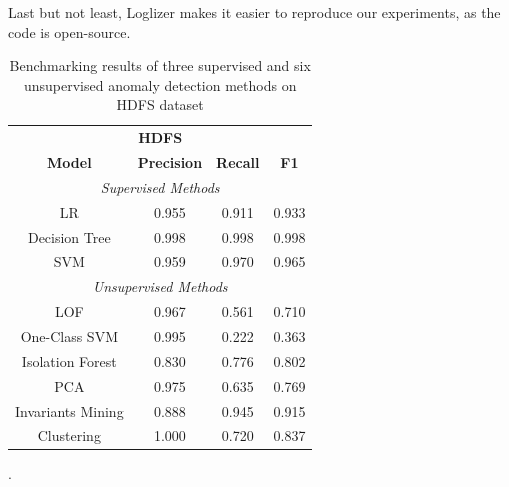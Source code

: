 Last but not least, Loglizer makes it easier to reproduce our experiments, as the code is open-source.

\begin{table}[h]
\centering
\begin{tabular}{@{}cccc@{}}
\toprule
\multicolumn{4}{c}{\textbf{HDFS}} \\ 
\textbf{Model}    & \textbf{Precision} & \textbf{Recall} & \textbf{F1} \\  \toprule \midrule
\multicolumn{4}{c}{\textit{Supervised Methods}}                        \\ \midrule
LR                & 0.955              & 0.911           & 0.933       \\
Decision Tree     & 0.998              & 0.998           & 0.998       \\
SVM               & 0.959              & 0.970           & 0.965       \\ \midrule
\multicolumn{4}{c}{\textit{Unsupervised Methods}}                      \\ \midrule
LOF      & 0.967              & 0.561           & 0.710       \\
One-Class SVM     & 0.995              & 0.222           & 0.363       \\
Isolation Forest  & 0.830              & 0.776           & 0.802       \\
PCA               & 0.975              & 0.635           & 0.769       \\
Invariants Mining & 0.888              & 0.945           & 0.915       \\
Clustering        & 1.000              & 0.720           & 0.837       \\ \bottomrule
\end{tabular}
\caption{Benchmarking results of three supervised and six unsupervised anomaly detection methods on HDFS dataset \cite{he2016}}.
\label{table:loglizer}
\end{table}



